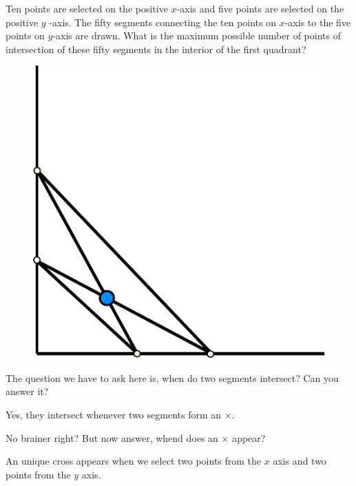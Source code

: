 \documentclass[compress]{beamer}
\begin{document}
\begin{frame}

    \textcolor{NordOrange}{
        Ten points are selected on the positive $x$-axis and five points are
        selected on the positive $y$ -axis. The fifty segments connecting the
        ten points on $x$-axis to the five points on $y$-axis are drawn.
        What is the maximum possible number of points of intersection of these
        fifty segments in the interior of the first quadrant?
    }

    \begin{figure}
        \begin{center}
            \includegraphics[width=.35\linewidth]{problem_1.pdf}
        \end{center}
    \end{figure}
\end{frame}

\begin{frame}
    The question we have to ask here is, when do two segments intersect? Can
    you answer it?

    \pause\vspace{1em}

    Yes, they intersect whenever \textcolor{NordBrightBlue}{two segments form
    an $\times$.} 

    \pause\vspace{1em}

    No brainer right? But now answer, whend does an $\times$ appear?

    \pause\vspace{1em}

    \textcolor{NordBrightBlue}{An unique cross appears when we select two
    points from the $x$ axis and two points from the $y$ axis.}
\end{frame}
\end{document}
